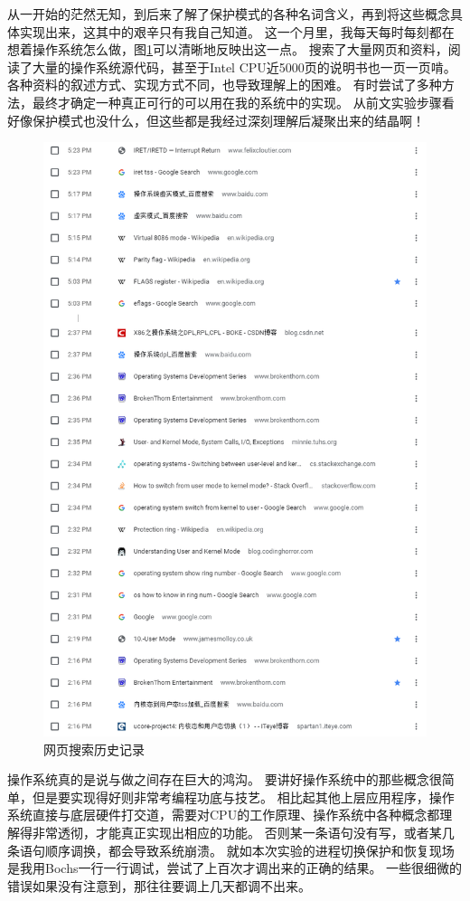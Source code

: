 \documentclass[logo,reportComp]{thesis}
\begin{document}
从一开始的茫然无知，到后来了解了保护模式的各种名词含义，再到将这些概念具体实现出来，这其中的艰辛只有我自己知道。
这一个月里，我每天每时每刻都在想着操作系统怎么做，图\ref{fig:web}可以清晰地反映出这一点。
搜索了大量网页和资料，阅读了大量的操作系统源代码，甚至于Intel CPU近5000页的说明书也一页一页啃。
各种资料的叙述方式、实现方式不同，也导致理解上的困难。
有时尝试了多种方法，最终才确定一种真正可行的可以用在我的系统中的实现。
从前文实验步骤看好像保护模式也没什么，但这些都是我经过深刻理解后凝聚出来的结晶啊！
\begin{figure}[H]
\centering
\includegraphics[width=0.6\linewidth]{fig/web-history.PNG}
\caption{网页搜索历史记录}
\label{fig:web}
\end{figure}

操作系统真的是说与做之间存在巨大的鸿沟。
要讲好操作系统中的那些概念很简单，但是要实现得好则非常考编程功底与技艺。
相比起其他上层应用程序，操作系统直接与底层硬件打交道，需要对CPU的工作原理、操作系统中各种概念都理解得非常透彻，才能真正实现出相应的功能。
否则某一条语句没有写，或者某几条语句顺序调换，都会导致系统崩溃。
就如本次实验的进程切换保护和恢复现场是我用Bochs一行一行调试，尝试了上百次才调出来的正确的结果。
一些很细微的错误如果没有注意到，那往往要调上几天都调不出来。
\end{document}
